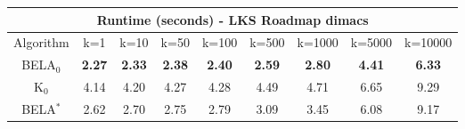 \begin{tabular}{c|cccccccc}\toprule
\multicolumn{9}{c}{Runtime (seconds) - LKS Roadmap dimacs}\\ \midrule
Algorithm & k=1 & k=10 & k=50 & k=100 & k=500 & k=1000 & k=5000 & k=10000 \\ \midrule
BELA$_0$ & \textbf{2.27} & \textbf{2.33} & \textbf{2.38} & \textbf{2.40} & \textbf{2.59} & \textbf{2.80} & \textbf{4.41} & \textbf{6.33} \\
K$_0$ & 4.14 & 4.20 & 4.27 & 4.28 & 4.49 & 4.71 & 6.65 & 9.29 \\
BELA$^*$ & 2.62 & 2.70 & 2.75 & 2.79 & 3.09 & 3.45 & 6.08 & 9.17 \\ \bottomrule 
\end{tabular}
